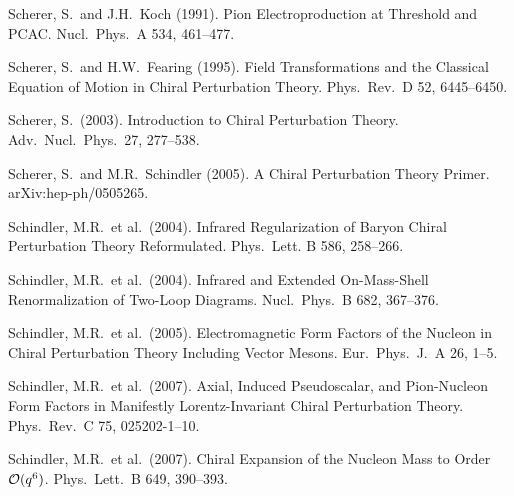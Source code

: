 \documentclass[twoside,12pt]{article}
\begin{document}
\begin{thebibliography}{}
Scherer, S.~and J.H.~Koch (1991).
Pion Electroproduction at Threshold and PCAC.
Nucl.\ Phys.\  A 534, 461--477.

Scherer, S.~and H.W.~Fearing (1995).
Field Transformations and the Classical Equation of Motion in Chiral
Perturbation Theory.
Phys.\ Rev.\  D 52, 6445--6450.

Scherer, S.~(2003).
Introduction to Chiral Perturbation Theory.
Adv.\ Nucl.\ Phys.\  27, 277--538.

Scherer, S.~and M.R.~Schindler (2005).
A Chiral Perturbation Theory Primer.
arXiv:hep-ph/0505265.

Schindler, M.R.~et al.~(2004).
Infrared Regularization of Baryon Chiral Perturbation Theory Reformulated.
Phys.\ Lett.  B 586, 258--266.

Schindler, M.R.~et al.~(2004).
Infrared and Extended On-Mass-Shell Renormalization of Two-Loop Diagrams.
Nucl.\ Phys.\  B 682, 367--376.

Schindler, M.R.~et al.~(2005).
Electromagnetic Form Factors of the Nucleon in Chiral Perturbation Theory
Including Vector Mesons.
Eur.\ Phys.\ J.\  A 26, 1--5.

Schindler, M.R.~et al.~(2007).
Axial, Induced Pseudoscalar, and Pion-Nucleon Form Factors in Manifestly
Lorentz-Invariant Chiral Perturbation Theory.
Phys.\ Rev.\  C  75, 025202-1--10.

Schindler, M.R.~et al.~(2007).
Chiral Expansion of the Nucleon Mass to Order ${\cal O}(q^6)$.
Phys.\ Lett.\  B 649, 390--393.


\end{thebibliography}
\end{document}

